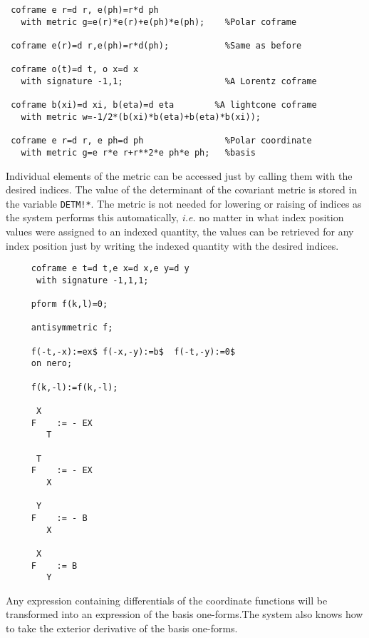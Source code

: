 \example{}

\begin{verbatim}
 coframe e r=d r, e(ph)=r*d ph
   with metric g=e(r)*e(r)+e(ph)*e(ph);    %Polar coframe

 coframe e(r)=d r,e(ph)=r*d(ph);           %Same as before

 coframe o(t)=d t, o x=d x
   with signature -1,1;                    %A Lorentz coframe

 coframe b(xi)=d xi, b(eta)=d eta        %A lightcone coframe
   with metric w=-1/2*(b(xi)*b(eta)+b(eta)*b(xi));

 coframe e r=d r, e ph=d ph                %Polar coordinate
   with metric g=e r*e r+r**2*e ph*e ph;   %basis

\end{verbatim}

Individual elements of the metric can be accessed just by calling them
with the desired indices. The value of the determinant of the
 
covariant metric is stored in the variable {\tt DETM!*}.  The metric
is not needed for lowering or raising of indices as the system
performs this automatically, {\em i.e.} no matter in what index
position values were assigned to an indexed quantity, the values can
be retrieved for any index position just by writing the indexed
quantity with the desired indices.

\example{}

\begin{verbatim}
     coframe e t=d t,e x=d x,e y=d y
      with signature -1,1,1;

     pform f(k,l)=0;

     antisymmetric f;

     f(-t,-x):=ex$ f(-x,-y):=b$  f(-t,-y):=0$
     on nero;

     f(k,-l):=f(k,-l);

      X
     F    := - EX
        T

      T
     F    := - EX
        X

      Y
     F    := - B
        X

      X
     F    := B
        Y
\end{verbatim}

Any expression containing differentials of the coordinate functions will
be transformed into an expression of the basis one-forms.The system also
knows how to take the exterior derivative of the basis one-forms.

